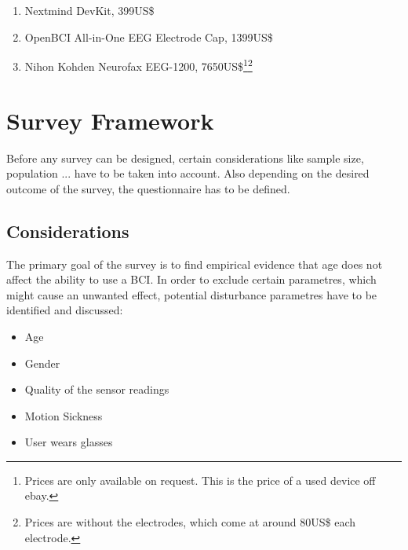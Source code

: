             \begin{enumerate}[label=\Alph*]
                \item Nextmind DevKit, 399US\$
                \item OpenBCI All-in-One EEG Electrode Cap, 1399US\$
                \item Nihon Kohden Neurofax EEG-1200, 7650US\$\footnote{Prices are only available on request. This is the price of a used device off ebay.}\footnote{Prices are without the electrodes, which come at around 80US\$ each electrode.}
            \end{enumerate}



    \chapter{Survey Framework}\label{survey-framework}

        Before any survey can be designed, certain considerations like sample size, population ... 
        have to be taken into account. Also depending on the desired outcome of the survey, the questionnaire has to be defined.

        \section{Considerations}\label{considerations}

            The primary goal of the survey is to find empirical evidence that age does not affect the ability to use a BCI. In order to exclude certain parametres, which might cause an unwanted effect, potential disturbance parametres have to be identified and discussed:

            \begin{itemize}
                \item Age
                \item Gender
                \item Quality of the sensor readings
                \item Motion Sickness
                \item User wears glasses
            \end{itemize}

